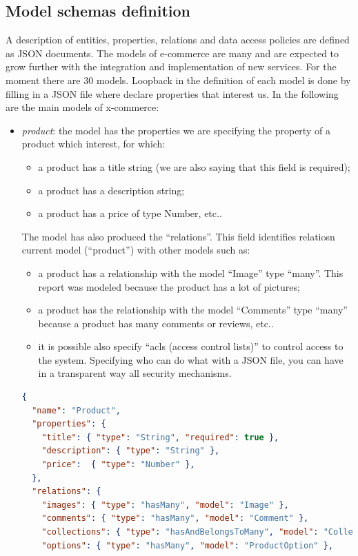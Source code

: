 \subsection{Model schemas definition}
A description of entities, properties, relations and data access policies are defined as JSON documents.
\newline
The models of e-commerce are many and are expected to grow further with the integration and implementation of new services. For the moment there are 30 models. Loopback in the definition of each model is done by filling in a JSON file where declare properties that interest us. In the following are the main models of x-commerce:
\begin{itemize}
\item \emph{product}: the model has the properties we are specifying the property of a product which interest, for which:
\begin{itemize}
\item a product has a title string (we are also saying that this field is required);
\item a product has a description string;
\item a product has a price of type Number, etc..
\end{itemize}
The model has also produced the “relations”. This field identifies relatiosn current model (“product”) with other models such as:
\begin{itemize}
\item a product has a relationship with the model “Image” type “many”. This report was modeled because the product has a lot of pictures;
\item a product has the relationship with the model “Comments” type “many” because a product has many comments or reviews, etc..
\item it is possible also specify “acls (access control lists)” to control access to the system. Specifying who can do what with a JSON file, you can have in a transparent way all security mechanisms.
\end{itemize}
\begin{lstlisting}[language=json]
{
  "name": "Product",
  "properties": {
    "title": { "type": "String", "required": true },
    "description": { "type": "String" },
    "price":  { "type": "Number" },
  },
  "relations": {
    "images": { "type": "hasMany", "model": "Image" },
    "comments": { "type": "hasMany", "model": "Comment" },
    "collections": { "type": "hasAndBelongsToMany", "model": "Collection" },
    "options": { "type": "hasMany", "model": "ProductOption" },

\end{lstlisting}
\end{itemize}
